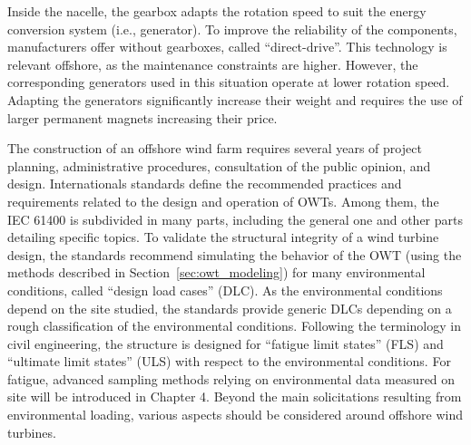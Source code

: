 Inside the nacelle, the gearbox adapts the rotation speed to suit the energy conversion system (i.e., generator). 
To improve the reliability of the components, manufacturers offer without gearboxes, called ``direct-drive''. 
This technology is relevant offshore, as the maintenance constraints are higher. 
However, the corresponding generators used in this situation operate at lower rotation speed. 
Adapting the generators significantly increase their weight and requires the use of larger permanent magnets increasing their price.   

The construction of an offshore wind farm requires several years of project planning, administrative procedures, consultation of the public opinion, and design. 
Internationals standards define the recommended practices and requirements related to the design and operation of OWTs. 
Among them, the IEC 61400 is subdivided in many parts, including the general one \citep{iec_2019} and other parts detailing specific topics.       
To validate the structural integrity of a wind turbine design, the standards recommend simulating the behavior of the OWT (using the methods described in Section~\ref{sec:owt_modeling}) for many environmental conditions, called ``design load cases'' (DLC). 
As the environmental conditions depend on the site studied, the standards provide generic DLCs depending on a rough classification of the environmental conditions. 
Following the terminology in civil engineering, the structure is designed for ``fatigue limit states'' (FLS) and ``ultimate limit states'' (ULS) with respect to the environmental conditions. 
For fatigue, advanced sampling methods relying on environmental data measured on site will be introduced in Chapter 4. 
Beyond the main solicitations resulting from environmental loading, various aspects should be considered around offshore wind turbines. 

